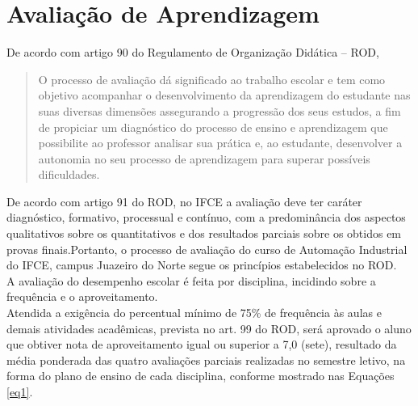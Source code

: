 \begin{landscape}
\addtocounter{chapter}{1}

\end{landscape}



\chapter{Avaliação de Aprendizagem}

De acordo com artigo 90 do Regulamento de Organização Didática – ROD, \begin{quote}
O processo  de avaliação dá significado ao trabalho escolar e tem como objetivo acompanhar o desenvolvimento da aprendizagem do estudante nas suas diversas dimensões assegurando a progressão dos seus estudos, a fim de propiciar um diagnóstico do processo de ensino e aprendizagem que possibilite ao professor analisar sua prática e, ao estudante, desenvolver a autonomia no seu processo de aprendizagem para superar possíveis dificuldades.
\end{quote}

De acordo com artigo 91 do ROD, no IFCE a avaliação deve ter caráter diagnóstico, formativo, processual e contínuo, com a predominância dos aspectos qualitativos sobre os quantitativos e dos resultados parciais sobre os obtidos em provas finais.Portanto, o processo de avaliação do curso de Automação Industrial do IFCE, campus Juazeiro do Norte segue os princípios estabelecidos no ROD.\\

A avaliação do desempenho escolar é feita por disciplina, incidindo sobre a frequência e o aproveitamento.\\

Atendida a exigência do percentual mínimo de 75\% de frequência às aulas e demais atividades acadêmicas, prevista no art. 99 do ROD, será aprovado o aluno que obtiver nota de aproveitamento igual ou superior a 7,0 (sete), resultado da média ponderada das quatro avaliações parciais realizadas no semestre letivo, na forma do plano de ensino de cada disciplina, conforme mostrado nas Equações \eqref{eq1}.

